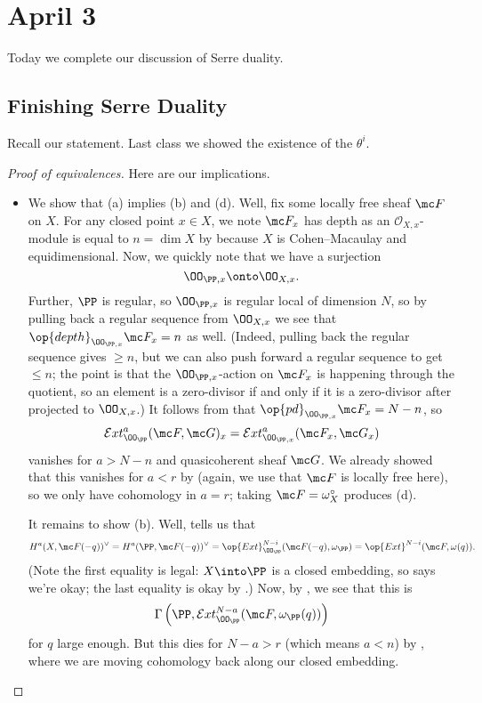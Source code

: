 \documentclass[../notes.tex]{subfiles}
\begin{document}
\section{April 3}

Today we complete our discussion of Serre duality.

\subsection{Finishing Serre Duality}
Recall our statement.
\serreduality*
\noindent Last class we showed the existence of the $\theta^i$.
\begin{proof}[Proof of equivalences]
	Here are our implications.
	\begin{itemize}
		\item We show that (a) implies (b) and (d). Well, fix some locally free sheaf $\mc F$ on $X$. For any closed point $x\in X$, we note $\mc F_x$ has depth as an $\mathcal O_{X,x}$-module is equal to $n=\dim X$ by  because $X$ is Cohen--Macaulay and equidimensional. Now, we quickly note that we have a surjection
		\[\OO_{\PP,x}\onto\OO_{X,x}.\]
		Further, $\PP$ is regular, so $\OO_{\PP,x}$ is regular local of dimension $N$, so by pulling back a regular sequence from $\OO_{X,x}$ we see that $\op{depth}_{\OO_{\PP,x}}\mc F_x=n$ as well. (Indeed, pulling back the regular sequence gives $\ge n$, but we can also push forward a regular sequence to get $\le n$; the point is that the $\OO_{\PP,x}$-action on $\mc F_x$ is happening through the quotient, so an element is a zero-divisor if and only if it is a zero-divisor after projected to $\OO_{X,x}$.) It follows from  that $\op{pd}_{\OO_{\PP,x}}\mc F_x=N-n$, so
		\[\mathcal Ext^a_{\OO_\PP}(\mc F,\mc G)_x=\mathcal Ext^a_{\OO_{\PP,x}}(\mc F_x,\mc G_x)\]
		vanishes for $a>N-n$ and quasicoherent sheaf $\mc G$. We already showed that this vanishes for $a<r$ by  (again, we use that $\mc F$ is locally free here), so we only have cohomology in $a=r$; taking $\mc F=\omega^\circ_X$ produces (d).

		It remains to show (b). Well,  tells us that
		\[H^a(X,\mc F(-q))^\lor=H^a(\PP,\mc F(-q))^\lor=\op{Ext}^{N-i}_{\OO_\PP}(\mc F(-q),\omega_\PP)=\op{Ext}^{N-i}(\mc F,\omega(q)).\]
		(Note the first equality is legal: $X\into\PP$ is a closed embedding, so  says we're okay; the last equality is okay by .) Now, by , we see that this is
		\[\Gamma\left(\PP,\mathcal Ext^{N-a}_{\OO_\PP}(\mc F,\omega_\PP(q))\right)\]
		for $q$ large enough. But this dies for $N-a>r$ (which means $a<n$) by , where we are moving cohomology back along our closed embedding.


\end{itemize}
\end{proof}
\end{document}
